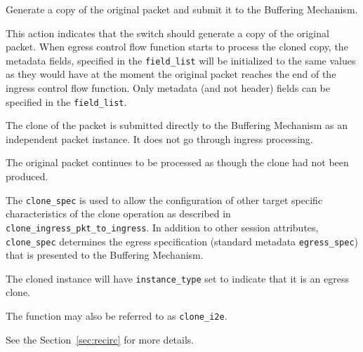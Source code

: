 \documentclass[12pt]{article}
\begin{document}
{ %
Generate a copy of the original packet and submit it to the Buffering Mechanism.
}
{ %
}
{ %
{
This action indicates that the switch should generate a copy of the original packet. When egress control flow function starts to process the cloned copy, the metadata fields, specified in the \texttt{field_list} will be initialized to the same values as they would have at the moment the original packet reaches the end of the ingress control flow function. Only metadata (and not header) fields can be specified in the \texttt{field_list}.
}

The clone of the packet is submitted directly to the Buffering Mechanism as 
an independent packet instance. It does not go through ingress \matchaction 
processing.

The original packet continues to be processed as though the clone had not 
been produced.

The \texttt{clone_spec} is used to allow the configuration of other target specific 
characteristics of the clone operation as described in \texttt{clone_ingress_pkt_to_ingress}. 
In addition to other session attributes, \texttt{clone_spec} determines the egress 
specification (standard metadata \texttt{egress_spec}) that is presented to the 
Buffering Mechanism.

The cloned instance will have \texttt{instance_type} set to indicate that it is an 
egress clone. 

The function may also be referred to as \texttt{clone_i2e}.

See the Section~\ref{sec:recirc} for more details.

}

\end{document}
